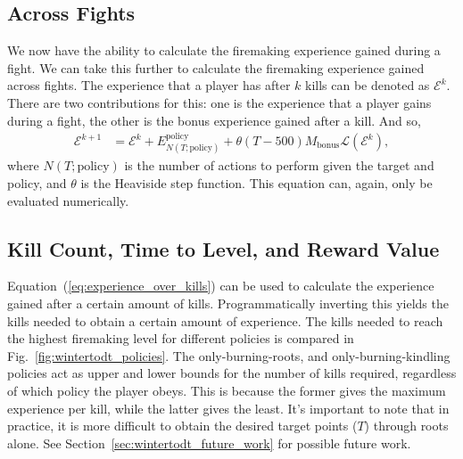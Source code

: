 	\subsection{Across Fights}
		We now have the ability to calculate the firemaking experience gained during a fight. We can take this further to calculate the firemaking experience gained across fights. The experience that a player has after $k$ kills can be denoted as $\mathcal{E}^k$. There are two contributions for this: one is the experience that a player gains during a fight, the other is the bonus experience gained after a kill. And so,
		\begin{align}\label{eq:experience_over_kills}
			\mathcal{E}^{k+1} &= \mathcal{E}^k + E_{N(T; \text{policy})}^\text{policy} + \theta(T - 500)M_\text{bonus}\mathcal{L}(\mathcal{E}^k),
		\end{align}
		where $N(T; \text{policy})$ is the number of actions to perform given the target and policy, and $\theta$ is the Heaviside step function. This equation can, again, only be evaluated numerically. 

	\subsection{Kill Count, Time to Level, and Reward Value}
		Equation~(\ref{eq:experience_over_kills}) can be used to calculate the experience gained after a certain amount of kills. Programmatically inverting this yields the kills needed to obtain a certain amount of experience. The kills needed to reach the highest firemaking level for different policies is compared in Fig.~\ref{fig:wintertodt_policies}. The only-burning-roots, and only-burning-kindling policies act as upper and lower bounds for the number of kills required, regardless of which policy the player obeys. This is because the former gives the maximum experience per kill, while the latter gives the least. It's important to note that in practice, it is more difficult to obtain the desired target points ($T$) through roots alone. See Section~\ref{sec:wintertodt_future_work} for possible future work.

